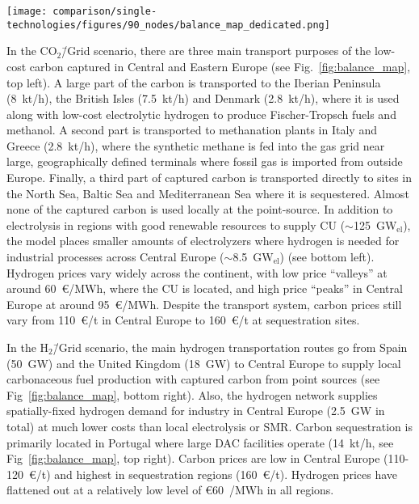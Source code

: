 \documentclass[twocolumn]{article}
\newcommand{\carbongrid}{CO$_2$\=/Grid}
\newcommand{\carbonscenario}{CO$_2$\=/Grid scenario}
\newcommand{\hydrogenscenario}{H$_2$\=/Grid scenario}
\begin{document}
\begin{figure*}[ht!]
    \centering
    \texttt{[image: comparison/single-technologies/figures/90\_nodes/balance\_map\_dedicated.png]}
    \caption{Average production, consumption, flows and prices of the carbon (top line) and hydrogen (bottom line) sectors in the \carbongrid{} (left) and the \hydrogenscenario{} (right). For each region, upper semicircles show the average production per technology, lower semicircles the consumption, and colors the average marginal prices. Lines and arrows show the interregional transportation. Carbon sequestration offshore is drawn in full circles.
    }
    \label{fig:balance_map}
\end{figure*}


In the \carbonscenario, there are three main transport purposes of the low-cost carbon captured in Central and Eastern Europe (see Fig.~\ref{fig:balance_map}, top left). A large part of the carbon is transported to the Iberian Peninsula (8~kt/h), the British Isles (7.5~kt/h) and Denmark (2.8~kt/h), where it is used along with low-cost electrolytic hydrogen to produce Fischer-Tropsch fuels and methanol. A second part is transported to methanation plants in Italy and Greece (2.8~kt/h), where the synthetic methane is fed into the gas grid near large, geographically defined terminals where fossil gas is imported from outside Europe. Finally, a third part of captured carbon is transported directly to sites in the North Sea, Baltic Sea and Mediterranean Sea where it is sequestered. Almost none of the captured carbon is used locally at the point-source. In addition to electrolysis in regions with good renewable resources to supply CU ($\sim$125~GW$_\text{el}$), the model places smaller amounts of electrolyzers where hydrogen is needed for industrial processes across Central Europe ($\sim$8.5~GW$_\text{el}$) (see bottom left). Hydrogen prices vary widely across the continent, with low price ``valleys'' at around 60~€/MWh, where the CU is located, and high price ``peaks'' in Central Europe at around 95~€/MWh. Despite the transport system, carbon prices still vary from 110~€/t in Central Europe to 160~€/t at sequestration sites.

In the \hydrogenscenario{}, the main hydrogen transportation routes go from Spain (50~GW) and the United Kingdom (18~GW) to Central Europe to supply local carbonaceous fuel production with captured carbon from point sources (see Fig~\ref{fig:balance_map}, bottom right). Also, the hydrogen network supplies spatially-fixed hydrogen demand for industry in Central Europe (2.5~GW in total) at much lower costs than local electrolysis or SMR. Carbon sequestration is primarily located in Portugal where large DAC facilities operate (14~kt/h, see Fig~\ref{fig:balance_map}, top right). Carbon prices are low in Central Europe (110-120~€/t) and highest in sequestration regions (160~€/t). Hydrogen prices have flattened out at a relatively low level of €60~/MWh in all regions.
\end{document}
